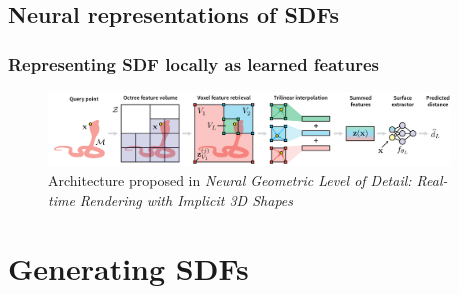 \documentclass[handout]{beamer}
\begin{document}
\subsection{Neural representations of SDFs}
\begin{frame}
  \frametitle{Representing SDF locally as learned features}
  \begin{figure}
    \centering
    \includegraphics[width=0.95\textwidth]{figures/neural-sdf.png}
    \caption{Architecture proposed in \textit{Neural Geometric Level of Detail: Real-time Rendering with Implicit 3D Shapes}}
    \label{fig:neural-sdf}
  \end{figure}
\end{frame}


\section{Generating SDFs}
\end{document}
